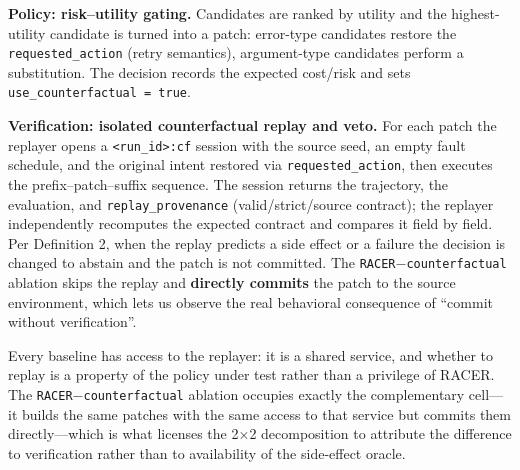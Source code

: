 \documentclass[10pt]{article}
\begin{document}
\textbf{Policy: risk--utility gating.} Candidates are ranked by utility and the highest-utility candidate is turned into a patch: error-type candidates restore the \texttt{requested\_action} (retry semantics), argument-type candidates perform a substitution. The decision records the expected cost/risk and sets \texttt{use\_counterfactual = true}.

\textbf{Verification: isolated counterfactual replay and veto.} For each patch the replayer opens a \texttt{<run\_id>:cf} session with the source seed, an empty fault schedule, and the original intent restored via \texttt{requested\_action}, then executes the prefix--patch--suffix sequence. The session returns the trajectory, the evaluation, and \texttt{replay\_provenance} (valid/strict/source contract); the replayer independently recomputes the expected contract and compares it field by field. Per Definition 2, when the replay predicts a side effect or a failure the decision is changed to abstain and the patch is not committed. The \texttt{RACER$-$counterfactual} ablation skips the replay and \textbf{directly commits} the patch to the source environment, which lets us observe the real behavioral consequence of ``commit without verification''.

Every baseline has access to the replayer: it is a shared service, and whether to replay is a property of the policy under test rather than a privilege of RACER. The \texttt{RACER$-$counterfactual} ablation occupies exactly the complementary cell---it builds the same patches with the same access to that service but commits them directly---which is what licenses the 2$\times$2 decomposition to attribute the difference to verification rather than to availability of the side-effect oracle.
\end{document}
